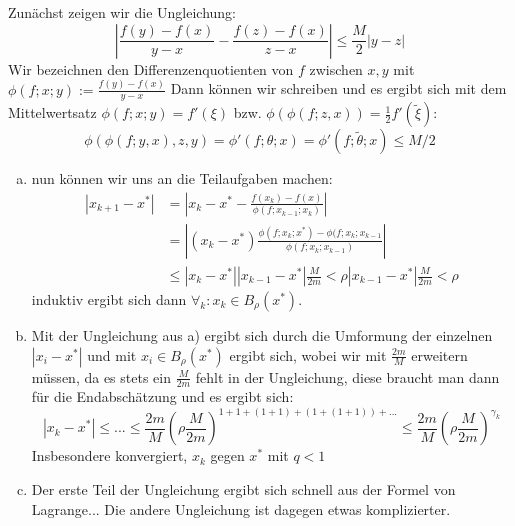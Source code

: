 \documentclass[a4paper]{scrartcl}
\begin{document}
\begin{aufgabe}
Zunächst zeigen wir die Ungleichung:
\[
|\frac{f(y)-f(x)}{y-x}-\frac{f(z)-f(x)}{z-x}|\le \frac{M}{2} |y-z|
\]
Wir bezeichnen den Differenzenquotienten von $ f $ zwischen $ x,y $ mit $ \phi(f; x; y):= \frac{f(y)-f(x)}{y-x} $ Dann können wir schreiben und es ergibt sich mit dem Mittelwertsatz $ \phi(f;x;y)=f'(\xi) $ bzw. $ \phi(\phi(f;z, x))=\frac{1}{2}f'(\tilde \xi)  $:
\[
\phi(\phi(f;y,x), z, y)=\phi'(f;\theta; x)=\phi'(f; \tilde \theta; x)\le M/2
\]
\begin{enumerate}[a)]
\item nun können wir uns an die Teilaufgaben machen:
\begin{align*}
|x_{k+1}-x^*|&=|x_k-x^*- \frac{f(x_k)-f(x)}{\phi(f; x_{k-1}; x_k)}| \\
&= |(x_k-x^*)\frac{\phi(f; x_k; x^*)-\phi(f; x_k; x_{k-1}}{\phi(f; x_k; x_{k-1})}|\\
&\le |x_k-x^*||x_{k-1}-x^*| \frac{M}{2m} < \rho |x_{k-1}-x^*| \frac{M}{2m} < \rho
\end{align*}
induktiv ergibt sich dann $ \forall_k: x_k \in B_\rho(x^*) $.
\item Mit der Ungleichung aus a) ergibt sich durch die Umformung der einzelnen $ |x_{i}-x^*| $ und mit $ x_{i}\in B_\rho(x^*) $ ergibt sich, wobei wir mit $ \frac{2m}{M} $ erweitern müssen, da es stets ein $\frac{M}{2m}$ fehlt in der Ungleichung, diese braucht man dann für die Endabschätzung und es ergibt sich:
\[
|x_{k}-x^*|\le ... \le \frac{2m}{M} (\rho \frac{M}{2m})^{1+1+(1+1)+(1+(1+1))+...}\le \frac{2m}{M} (\rho \frac{M}{2m})^{\gamma_k}
\] 
Insbesondere konvergiert,  $ x_k $ gegen $ x^* $ mit $ q<1 $
\item Der erste Teil der Ungleichung ergibt sich schnell aus der Formel von Lagrange... Die andere Ungleichung ist dagegen etwas komplizierter.
\end{enumerate}
\end{aufgabe}
\end{document}
